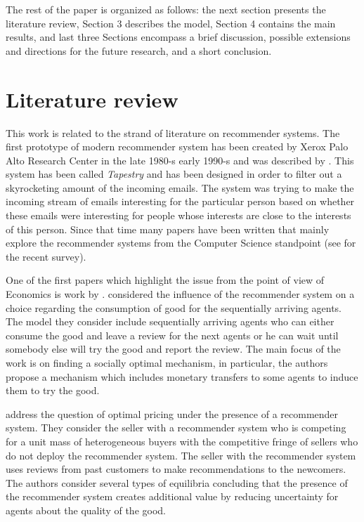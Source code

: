 \documentclass[a4paper]{article}
\begin{document}
The rest of the paper is organized as follows: the next section presents the literature review, Section 3 describes the model, Section 4 contains the main results, and last three Sections encompass a brief discussion, possible extensions and directions for the future research, and a short conclusion.

	
	
	
	
	\section{Literature review}
	
		This work is related to the strand of literature on recommender systems. The first prototype of modern recommender system has been created by Xerox Palo Alto Research Center in the late 1980-s early 1990-s and was described by  \cite{goldberg1992using}. This system has been called \textit{Tapestry} and has been designed in order to filter out a skyrocketing amount of the incoming emails. The system was trying to make the incoming stream of emails interesting for the particular person based on whether these emails were interesting for people whose interests are close to the interests of this person. Since that time many papers have been written that mainly explore the recommender systems from the Computer Science standpoint (see \cite{Beel2015r} for the recent survey). 
	
	
	
	
	
One of the first papers which highlight the issue from the point of view of Economics is work by \cite{avery1999market}. \cite{avery1999market} considered the influence of the recommender system on a choice regarding the consumption of good for the sequentially arriving agents. The model they consider include sequentially arriving agents who can either consume the good and leave a review for the next agents or he can wait until somebody else will try the good and report the review. The main focus of the work is on finding a socially optimal mechanism, in particular, the authors propose a mechanism which includes monetary transfers to some agents to induce them to try the good.   
		
		
		
\cite{bergemann2006optimal} address the question of optimal pricing under the presence of a recommender system. They consider the seller with a recommender system who is competing for a unit mass of heterogeneous buyers with the competitive fringe of sellers who do not deploy the recommender system. The seller with the recommender system uses reviews from past customers to make recommendations to the newcomers. The authors consider several types of equilibria concluding that the presence of the recommender system creates additional value by reducing uncertainty for agents about the quality of the good.
\end{document}
